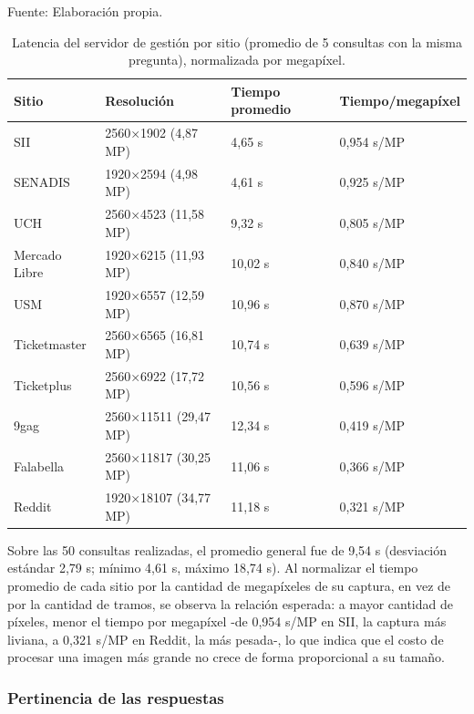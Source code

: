 \begin{table}[h]
    \centering
    \caption{\label{table:latenciabackend} Latencia del servidor de gestión por sitio (promedio de 5 consultas con la misma pregunta), normalizada por megapíxel.} Fuente: Elaboración propia.
    \begin{tabular}{|p{3.3cm}|p{2.8cm}|p{2.8cm}|p{3.2cm}|}
        \hline
        \textbf{Sitio} & \textbf{Resolución} & \textbf{Tiempo promedio} & \textbf{Tiempo/megapíxel} \\
        \hline
        SII & 2560×1902 (4,87 MP) & 4,65 s & 0,954 s/MP \\
        \hline
        SENADIS & 1920×2594 (4,98 MP) & 4,61 s & 0,925 s/MP \\
        \hline
        UCH & 2560×4523 (11,58 MP) & 9,32 s & 0,805 s/MP \\
        \hline
        Mercado Libre & 1920×6215 (11,93 MP) & 10,02 s & 0,840 s/MP \\
        \hline
        USM & 1920×6557 (12,59 MP) & 10,96 s & 0,870 s/MP \\
        \hline
        Ticketmaster & 2560×6565 (16,81 MP) & 10,74 s & 0,639 s/MP \\
        \hline
        Ticketplus & 2560×6922 (17,72 MP) & 10,56 s & 0,596 s/MP \\
        \hline
        9gag & 2560×11511 (29,47 MP) & 12,34 s & 0,419 s/MP \\
        \hline
        Falabella & 2560×11817 (30,25 MP) & 11,06 s & 0,366 s/MP \\
        \hline
        Reddit & 1920×18107 (34,77 MP) & 11,18 s & 0,321 s/MP \\
        \hline
    \end{tabular}
\end{table}

Sobre las 50 consultas realizadas, el promedio general fue de 9,54 s (desviación estándar 2,79 s; mínimo 4,61 s, máximo 18,74 s). Al normalizar el tiempo promedio de cada sitio por la cantidad de megapíxeles de su captura, en vez de por la cantidad de tramos, se observa la relación esperada: a mayor cantidad de píxeles, menor el tiempo por megapíxel -de 0,954 s/MP en SII, la captura más liviana, a 0,321 s/MP en Reddit, la más pesada-, lo que indica que el costo de procesar una imagen más grande no crece de forma proporcional a su tamaño.

\subsubsection{Pertinencia de las respuestas}

